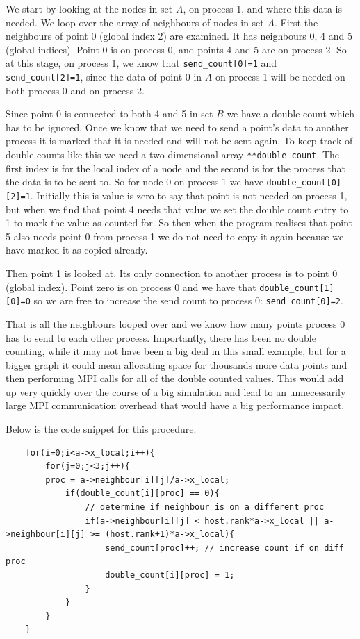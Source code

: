 \documentclass[pdftex,12pt,a4paper]{article}
\begin{document}
We start by looking at the nodes in set $A$, on process 1, and where this data is needed. We loop over the array of neighbours of nodes in set $A$. First the neighbours of point 0 (global index 2) are examined. It has neighbours 0, 4 and 5 (global indices). Point 0 is on process 0, and points 4 and 5 are on process 2. So at this stage, on process 1, we know that \verb|send_count[0]=1| and \verb|send_count[2]=1|, since the data of point 0 in $A$ on process 1 will be needed on both process 0 and on process 2.

Since point 0 is connected to both 4 and 5 in set $B$ we have a double count which has to be ignored. Once we know that we need to send a point's data to another process it is marked that it is needed and will not be sent again. To keep track of double counts like this we need a two dimensional array \verb|**double count|. The first index is for the local index of a node and the second is for the process that the data is to be sent to. So for node 0 on process 1 we have \verb|double_count[0][2]=1|. Initially this is value is zero to say that point is not needed on process 1, but when we find that point 4 needs that value we set the double count entry to 1 to mark the value as counted for. So then when the program realises that point 5 also needs point 0 from process 1 we do not need to copy it again because we have marked it as copied already.

Then point 1 is looked at. Its only connection to another process is to point 0 (global index). Point zero is on process 0 and we have that \verb|double_count[1][0]=0| so we are free to increase the send count to process 0: \verb|send_count[0]=2|.

That is all the neighbours looped over and we know how many points process 0 has to send to each other process. Importantly, there has been no double counting, while it may not have been a big deal in this small example, but for a bigger graph it could mean allocating space for thousands more data points and then performing MPI calls for all of the double counted values. This would add up very quickly over the course of a big simulation and lead to an unnecessarily large MPI communication overhead that would have a big performance impact.

Below is the code snippet for this procedure.


\begin{lstlisting}
	for(i=0;i<a->x_local;i++){
		for(j=0;j<3;j++){
		proc = a->neighbour[i][j]/a->x_local;
			if(double_count[i][proc] == 0){
				// determine if neighbour is on a different proc
				if(a->neighbour[i][j] < host.rank*a->x_local || a->neighbour[i][j] >= (host.rank+1)*a->x_local){
					send_count[proc]++; // increase count if on diff proc
					double_count[i][proc] = 1;
				}
			}
		}
	}
\end{lstlisting}
\end{document}

